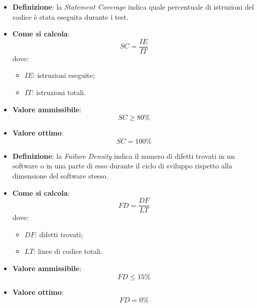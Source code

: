 \begin{itemize}
	\item \textbf{Definizione}: la \textit{Statement Coverage} indica quale percentuale di istruzioni del codice è stata eseguita durante i test.
	\item \textbf{Come si calcola}: \begin{equation*}SC = \frac{IE}{IT}\end{equation*} dove:
		\begin{itemize}
			\item $IE$: istruzioni eseguite;
			\item $IT$: istruzioni totali.
		\end{itemize}
	\item \textbf{Valore ammissibile}: \begin{equation*}SC \geq 80\%\end{equation*}
	\item \textbf{Valore ottimo}: \begin{equation*}SC = 100\%\end{equation*}
\end{itemize}

\begin{itemize}
	\item \textbf{Definizione}: la \textit{Failure Density} indica il numero di difetti trovati in un software o in una parte di esso durante il ciclo di sviluppo rispetto alla dimensione del software stesso.
	\item \textbf{Come si calcola}: \begin{equation*}FD = \frac{DF}{LT}\end{equation*} dove:
		\begin{itemize}
			\item $DF$: difetti trovati;
			\item $LT$: linee di codice totali.
		\end{itemize}
	\item \textbf{Valore ammissibile}: \begin{equation*}FD \leq 15\%\end{equation*}
	\item \textbf{Valore ottimo}: \begin{equation*}FD = 0\%\end{equation*}
\end{itemize}

